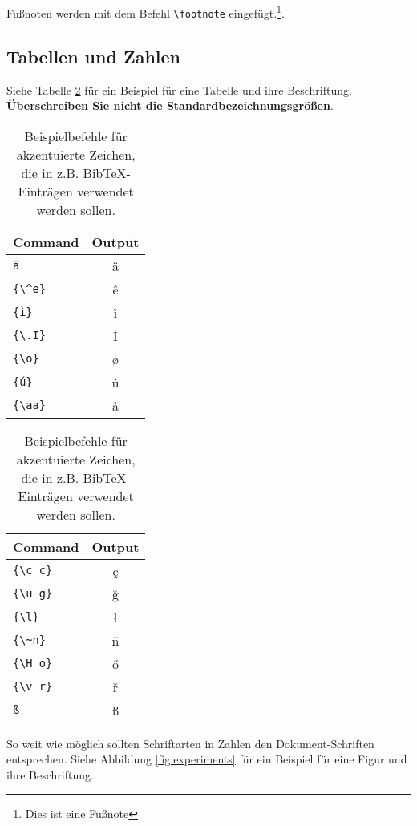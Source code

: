 \documentclass[11pt]{article}
\begin{document}
Fußnoten werden mit dem Befehl \verb|\footnote| eingefügt.\footnote{Dies ist eine Fußnote}.

\subsection{Tabellen und Zahlen}

Siehe Tabelle \ref{tab:accents} für ein Beispiel für eine Tabelle und ihre Beschriftung. \textbf{Überschreiben Sie nicht die Standardbezeichnungsgrößen}.

\begin{table}
  \centering\begin{tabular}{lc}
    \hline
    \textbf{Command} & \textbf{Output} \\
    \hline
    \verb|ä|     & ä           \\
    \verb|{\^e}|     & {\^e}           \\
    \verb|{ì}|     & {ì}           \\
    \verb|{\.I}|     & {\.I}           \\
    \verb|{\o}|      & {\o}            \\
    \verb|{ú}|     & {ú}           \\
    \verb|{\aa}|     & {\aa}           \\\hline
  \end{tabular}
  \begin{tabular}{lc}
    \hline
    \textbf{Command} & \textbf{Output} \\
    \hline
    \verb|{\c c}|    & {\c c}          \\
    \verb|{\u g}|    & {\u g}          \\
    \verb|{\l}|      & {\l}            \\
    \verb|{\~n}|     & {\~n}           \\
    \verb|{\H o}|    & {\H o}          \\
    \verb|{\v r}|    & {\v r}          \\
    \verb|ß|     & ß           \\
    \hline
  \end{tabular}
  \caption{Beispielbefehle für akzentuierte Zeichen, die in z.B. Bib\TeX{}-Einträgen verwendet werden sollen.}
  \label{tab:accents}
\end{table}

So weit wie möglich sollten Schriftarten in Zahlen den Dokument-Schriften entsprechen. Siehe Abbildung \ref{fig:experiments} für ein Beispiel für eine Figur und ihre Beschriftung.
\end{document}
